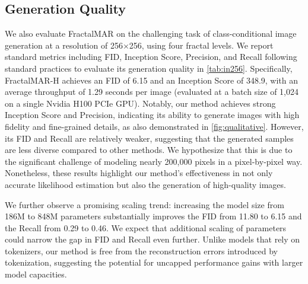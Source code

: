 \subsection{Generation Quality} 
We also evaluate FractalMAR on the challenging task of class-conditional image generation at a resolution of 256$\times$256, using four fractal levels.
We report standard metrics including FID, Inception Score, Precision, and Recall following standard practices to evaluate its generation quality in \autoref{tab:in256}. Specifically, FractalMAR-H achieves an FID of 6.15 and an Inception Score of 348.9, with an average throughput of 1.29 seconds per image (evaluated at a batch size of 1,024 on a single Nvidia H100 PCIe GPU). Notably, our method achieves  strong Inception Score and Precision, indicating its ability to generate images with high fidelity and fine-grained details, as also demonstrated in \autoref{fig:qualitative}. However, its FID and Recall are relatively weaker, suggesting that the generated samples are less diverse compared to other methods. We hypothesize that this is due to the significant challenge of modeling nearly 200,000 pixels in a pixel-by-pixel way. Nonetheless, these results highlight our method's effectiveness in not only accurate likelihood estimation but also the generation of high-quality images.

We further observe a promising scaling trend: increasing the model size from 186M to 848M parameters substantially improves the FID from 11.80 to 6.15 and the Recall from 0.29 to 0.46. We expect that additional scaling of parameters could narrow the gap in FID and Recall even further. Unlike models that rely on tokenizers, our method is free from the reconstruction errors introduced by tokenization, suggesting the potential for uncapped performance gains with larger model capacities.

